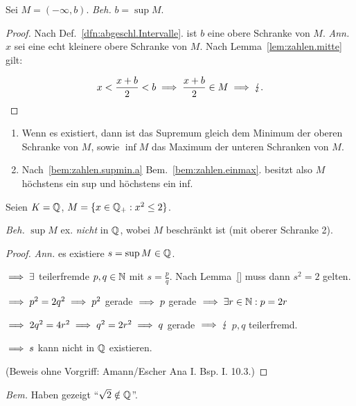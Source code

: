 \documentclass[12pt]{scrreprt}
\begin{document}
\begin{bsp} Sei $M=(-\infty,b)$. \textit{Beh.} $b=\sup M$.
\begin{proof} Nach Def.~\ref{dfn:abgeschl.Intervalle}. ist $b$ eine obere Schranke von $M$. \textit{Ann.} $x$ sei eine echt kleinere obere Schranke von $M$. Nach Lemma~\ref{lem:zahlen.mitte} gilt:

\[\displaystyle x < \frac{x+b}{2} < b\implies\frac{x+b}{2}\in M\implies\lightning.\]
\end{proof}
\end{bsp}

\begin{bem}\label{bem:zahlen.supmin}
\begin{enumerate}%
\item\label{bem:zahlen.supmin.a} Wenn es existiert, dann ist das Supremum gleich dem Minimum der oberen Schranke von $M$, sowie $\inf M$ das Maximum der unteren Schranken von $M$.

\item Nach~\ref{bem:zahlen.supmin.a} Bem.~\ref{bem:zahlen.einmax}. besitzt also $M$ höchstens ein sup und höchstens ein inf.
\end{enumerate}
\end{bem}

\begin{bsp}\label{bsp:zahlen.wurzelzwei}
Seien $K = \mathbb{Q}$, $M = \{x\in\mathbb{Q}_+: x^2 \leq 2\}$.

\textit{Beh.} $\sup M$ ex. \textit{nicht} in $\mathbb{Q}$, wobei $M$ beschränkt ist (mit oberer Schranke 2).
\begin{proof}\textit{Ann.} es existiere $s = \sup M\in\mathbb{Q}$.

$\implies \exists$ teilerfremde $p,q\in\mathbb{N}$ mit $\displaystyle s=\frac{p}{q}$. Nach Lemma~\ref{} muss dann $s^2 = 2$ gelten.

$\implies p^2 = 2q^2\implies p^2$ gerade $\implies p$ gerade $\implies\exists r\in\mathbb{N}: p = 2r$

$\implies 2q^2 = 4r^2\implies q^2=2r^2\implies q$ gerade $\implies\lightning$ $p,q$ teilerfremd.

$\implies s$ kann nicht in $\mathbb{Q}$ existieren.

(Beweis ohne Vorgriff: Amann/Escher Ana I. Bsp. I. 10.3.)
\end{proof}

\textit{Bem.} Haben gezeigt "`$\sqrt{2}\notin\mathbb{Q}$"'.
\end{bsp}
\end{document}
